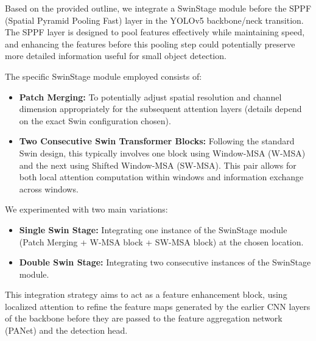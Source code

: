 \documentclass[conference]{IEEEtran}
\begin{document}
Based on the provided outline, we integrate a SwinStage module before the SPPF (Spatial Pyramid Pooling Fast) layer in the YOLOv5 backbone/neck transition. The SPPF layer is designed to pool features effectively while maintaining speed, and enhancing the features before this pooling step could potentially preserve more detailed information useful for small object detection.

The specific SwinStage module employed consists of:
\begin{itemize}
    \item \textbf{Patch Merging:} To potentially adjust spatial resolution and channel dimension appropriately for the subsequent attention layers (details depend on the exact Swin configuration chosen).
    \item \textbf{Two Consecutive Swin Transformer Blocks:} Following the standard Swin design, this typically involves one block using Window-MSA (W-MSA) and the next using Shifted Window-MSA (SW-MSA). This pair allows for both local attention computation within windows and information exchange across windows.
\end{itemize}
We experimented with two main variations:
\begin{itemize}
    \item \textbf{Single Swin Stage:} Integrating one instance of the SwinStage module (Patch Merging + W-MSA block + SW-MSA block) at the chosen location.
    \item \textbf{Double Swin Stage:} Integrating two consecutive instances of the SwinStage module.
\end{itemize}



This integration strategy aims to act as a feature enhancement block, using localized attention to refine the feature maps generated by the earlier CNN layers of the backbone before they are passed to the feature aggregation network (PANet) and the detection head.
\end{document}
